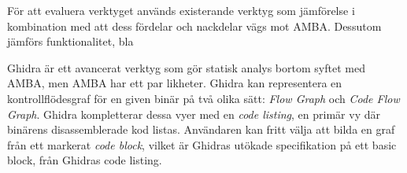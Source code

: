 



För att evaluera verktyget används existerande verktyg som jämförelse i
kombination med att dess fördelar och nackdelar vägs mot AMBA. Dessutom jämförs
funktionalitet, bla

Ghidra är ett avancerat verktyg som gör statisk analys bortom syftet med AMBA,
men AMBA har ett par likheter. Ghidra kan representera en
kontrollflödesgraf för en given binär på två olika sätt: \textit{Flow
Graph} och \textit{Code Flow Graph}. Ghidra kompletterar dessa vyer
med en \textit{code listing}, en primär vy där binärens
disassemblerade kod listas. Användaren kan fritt välja att bilda en
graf från ett markerat \textit{code block}, vilket är Ghidras utökade
specifikation på ett basic block, från Ghidras code listing. 







